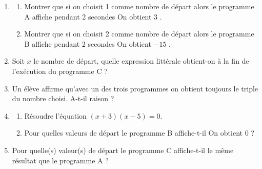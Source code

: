 \begin{enumerate}
	\item \begin{enumerate}
		\item Montrer que si on choisit 1 comme nombre de départ alors le programme A affiche pendant 2 secondes \og  On obtient 3  \fg{}.
		
		\item Montrer que si on choisit 2 comme nombre de départ alors le programme B affiche pendant 2 secondes \og  On obtient $-15$  \fg{}.
	\end{enumerate}
	
	\item Soit $x$ le nombre de départ, quelle expression littérale obtient-on à la fin de l'exécution du programme C ?
	
	\item Un élève affirme qu'avec un des trois programmes on obtient toujours le triple du nombre choisi. A-t-il raison ?
	
	\item \begin{enumerate}
		\item Résoudre l'équation $(x + 3)(x - 5) = 0$.
		
		\item Pour quelles valeurs de départ le programme B affiche-t-il \og  On obtient 0  \fg{} ?
	\end{enumerate}

	\item Pour quelle(s) valeur(s) de départ le programme C affiche-t-il le même résultat que le programme A ?
\end{enumerate}
\vspace{0,5cm}

